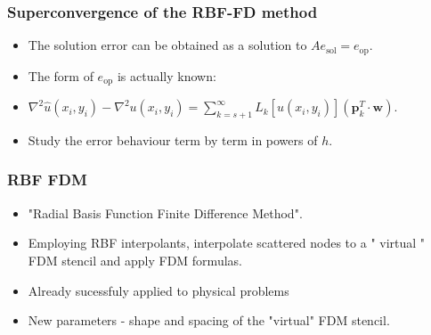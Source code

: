 \documentclass{beamer}
\begin{document}
\begin{frame}
\frametitle{Superconvergence of the RBF-FD method}
\begin{itemize}
\item<1-> The solution error can be obtained as a solution to $A e_\mathrm{sol} = e_\mathrm{op}$.
\item<2-> The form of $e_\mathrm{op}$ is actually known:
\item<2-> $\nabla^2\hat{u}(x_i,y_i) - \nabla^2u(x_i,y_i) = \sum_{k=s+1}^\infty L_k [u(x_i,y_i)] (\textbf{p}_k^T \cdot \textbf{w})$.
\item<3-> Study the error behaviour term by term in powers of $h$.
\end{itemize}
\end{frame}



\begin{frame}
\frametitle{RBF FDM}
\begin{itemize}
\item<1-> "Radial Basis Function Finite Difference Method".
\item<2-> Employing RBF interpolants, interpolate scattered nodes to a "{} virtual "{} FDM stencil and apply FDM formulas.
\item<2-> Already sucessfuly applied to physical problems
\item<3-> New parameters - shape and spacing of the "{}virtual"{} FDM stencil.
\end{itemize}
\end{frame}
\end{document}
